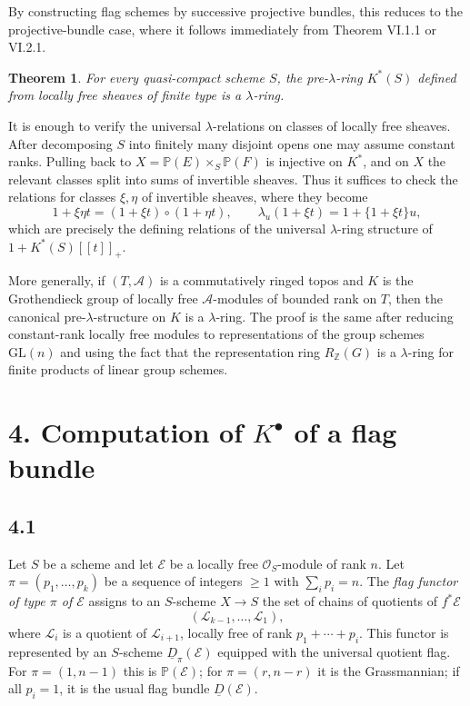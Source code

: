 \documentclass[13pt]{extarticle}
\newcommand{\ZZ}{\mathbb Z}
\newcommand{\cO}{\mathcal O}
\newtheorem*{theorem}{Theorem}
\begin{document}
By constructing flag schemes by successive projective bundles, this reduces to the projective-bundle case, where it follows immediately from Theorem VI.1.1 or VI.2.1.

\begin{theorem}\label{thm:VI.3.2}
For every quasi-compact scheme $S$, the pre-$\lambda$-ring $K^*(S)$ defined from locally free sheaves of finite type is a $\lambda$-ring.
\end{theorem}

It is enough to verify the universal $\lambda$-relations on classes of locally free sheaves. After decomposing $S$ into finitely many disjoint opens one may assume constant ranks. Pulling back to $X=\mathbb P(E)\times_S\mathbb P(F)$ is injective on $K^*$, and on $X$ the relevant classes split into sums of invertible sheaves. Thus it suffices to check the relations for classes $\xi,\eta$ of invertible sheaves, where they become
\[
1+\xi\eta t=(1+\xi t)\circ(1+\eta t),
\qquad
\lambda_u(1+\xi t)=1+\{1+\xi t\}u,
\]
which are precisely the defining relations of the universal $\lambda$-ring structure of $1+K^*(S)[[t]]_+$.

More generally, if $(T,\mathcal A)$ is a commutatively ringed topos and $K$ is the Grothendieck group of locally free $\mathcal A$-modules of bounded rank on $T$, then the canonical pre-$\lambda$-structure on $K$ is a $\lambda$-ring. The proof is the same after reducing constant-rank locally free modules to representations of the group schemes $\mathrm{GL}(n)$ and using the fact that the representation ring $R_{\ZZ}(G)$ is a $\lambda$-ring for finite products of linear group schemes.

\section*{4. Computation of $K^{\bullet}$ of a flag bundle}

\subsection*{4.1}
Let $S$ be a scheme and let $\mathcal E$ be a locally free $\cO_S$-module of rank $n$. Let $\pi=(p_1,\ldots,p_k)$ be a sequence of integers $\geq 1$ with $\sum_i p_i=n$. The \emph{flag functor of type $\pi$ of $\mathcal E$} assigns to an $S$-scheme $X\to S$ the set of chains of quotients of $f^*\mathcal E$
\[
(\mathcal L_{k-1},\ldots,\mathcal L_1),
\]
where $\mathcal L_i$ is a quotient of $\mathcal L_{i+1}$, locally free of rank $p_1+\cdots+p_i$. This functor is represented by an $S$-scheme $\underline D_\pi(\mathcal E)$ equipped with the universal quotient flag. For $\pi=(1,n-1)$ this is $\mathbb P(\mathcal E)$; for $\pi=(r,n-r)$ it is the Grassmannian; if all $p_i=1$, it is the usual flag bundle $\underline D(\mathcal E)$.
\end{document}
